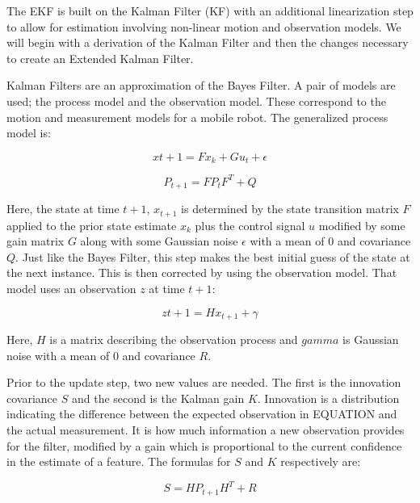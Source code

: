 \documentclass[12pt]{report}
\begin{document}
The EKF is built on the Kalman Filter (KF) with an additional linearization step to allow for estimation involving non-linear motion and observation models.  We will begin with a derivation of the Kalman Filter and then the changes necessary to create an Extended Kalman Filter.  

Kalman Filters are an approximation of the Bayes Filter.  A pair of models are used; the process model and the observation model.  These correspond to the motion and measurement models for a mobile robot.  The generalized process model is: 

\begin{equation}\label{kf_process_mean}
x{t+1} = Fx_k + Gu_t + \epsilon
\end{equation}

\begin{equation}\label{kf_process_cov}
P_{t+1} = FP_tF^T + Q
\end{equation}

Here, the state at time $t+1$, $x_{t+1}$ is determined by the state transition matrix $F$ applied to the prior state estimate $x_k$ plus the control signal $u$ modified by some gain matrix $G$ along with some Gaussian noise $\epsilon$ with a mean of 0 and covariance $Q$.	Just like the Bayes Filter, this step makes the best initial guess of the state at the next instance.  This is then corrected by using the observation model.  That model uses an observation $z$ at time $t+1$:

\begin{equation}\label{kf_observation}
z{t+1} = Hx_{t+1} + \gamma
\end{equation}

Here, $H$ is a matrix describing the observation process and $gamma$ is Gaussian noise with a mean of 0 and covariance $R$.  

Prior to the update step, two new values are needed.  The first is the innovation covariance $S$ and the second is the Kalman gain $K$.  Innovation is a distribution indicating the difference between the expected observation in {EQUATION} and the actual measurement.  It is how much information a new observation provides for the filter, modified by a gain which is proportional to the current confidence in the estimate of a feature.  The formulas for $S$ and $K$ respectively are:

\begin{equation}\label{kf_innovation}
S = HP_{t+1}H^T + R
\end{equation}
\end{document}
